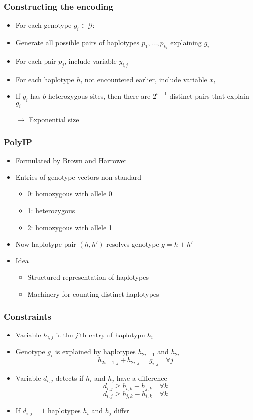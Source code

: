 \documentclass[handout]{beamer}
\begin{document}
\begin{frame}
\frametitle{Constructing the encoding}
\begin{itemize}
\item For each genotype $g_i\in \mathcal{G}$:
\item Generate all possible pairs of haplotypes $p_1, \dots , p_{k_i}$ explaining $g_i$
\item For each pair $p_j$, include variable $y_{i,j}$
\item For each haplotype $h_l$ not encountered earlier, include variable $x_l$
\item If $g_i$ has $b$ heterozygous sites, then there are $2^{b-1}$ distinct pairs that explain $g_i$
\item[$\rightarrow$] Exponential size
\end{itemize}
\end{frame}


\begin{frame}
\frametitle{PolyIP}
\begin{itemize}
\item Formulated by Brown and Harrower~\cite{DBLP:journals/tcbb/BrownH06}
\item Entries of genotype vectors non-standard
\begin{itemize}
\item 0: homozygous with allele 0
\item 1: heterozygous
\item 2: homozygous with allele 1
\end{itemize}
\item Now haplotype pair $(h, h')$ resolves genotype $g = h + h'$
\item Idea
\begin{itemize}
\item Structured representation of haplotypes
\item Machinery for counting distinct haplotypes
\end{itemize}
\end{itemize}
\end{frame}

\begin{frame}
\frametitle{Constraints}
\begin{itemize}
\item Variable $h_{i,j}$ is the $j$'th entry of haplotype $h_i$
\item Genotype $g_i$ is explained by haplotypes $h_{2i-1}$ and $h_{2i}$
$$ h_{2i-1, j} + h_{2i, j} = g_{i, j} \quad \forall j $$
\item Variable $d_{i,j}$ detects if $h_i$ and $h_j$ have a difference
$$ d_{i,j} \geq h_{i, k} - h_{j,k} \quad \forall k $$
$$ d_{i,j} \geq h_{j, k} - h_{i,k} \quad \forall k $$
\item If $d_{i,j}=1$ haplotypes $h_i$ and $h_j$ differ
\end{itemize}
\end{frame}
\end{document}
